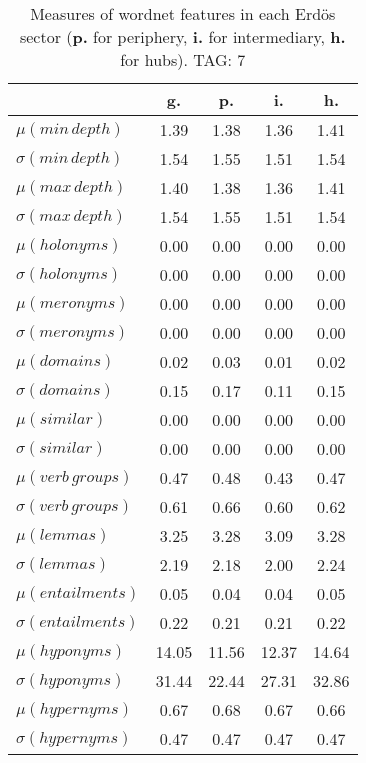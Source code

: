 \begin{table}[h!]
\begin{center}
\begin{tabular}{| l | c | c | c | c |}\hline
 & g. & p. & i. & h. \\\hline
$\mu(min\,depth)$ & 1.39  & 1.38  & 1.36  & 1.41 \\\hline
$\sigma(min\,depth)$ & 1.54  & 1.55  & 1.51  & 1.54 \\\hline
$\mu(max\,depth)$ & 1.40  & 1.38  & 1.36  & 1.41 \\\hline
$\sigma(max\,depth)$ & 1.54  & 1.55  & 1.51  & 1.54 \\\hline
$\mu(holonyms)$ & 0.00  & 0.00  & 0.00  & 0.00 \\\hline
$\sigma(holonyms)$ & 0.00  & 0.00  & 0.00  & 0.00 \\\hline
$\mu(meronyms)$ & 0.00  & 0.00  & 0.00  & 0.00 \\\hline
$\sigma(meronyms)$ & 0.00  & 0.00  & 0.00  & 0.00 \\\hline
$\mu(domains)$ & 0.02  & 0.03  & 0.01  & 0.02 \\\hline
$\sigma(domains)$ & 0.15  & 0.17  & 0.11  & 0.15 \\\hline
$\mu(similar)$ & 0.00  & 0.00  & 0.00  & 0.00 \\\hline
$\sigma(similar)$ & 0.00  & 0.00  & 0.00  & 0.00 \\\hline
$\mu(verb\,groups)$ & 0.47  & 0.48  & 0.43  & 0.47 \\\hline
$\sigma(verb\,groups)$ & 0.61  & 0.66  & 0.60  & 0.62 \\\hline
$\mu(lemmas)$ & 3.25  & 3.28  & 3.09  & 3.28 \\\hline
$\sigma(lemmas)$ & 2.19  & 2.18  & 2.00  & 2.24 \\\hline
$\mu(entailments)$ & 0.05  & 0.04  & 0.04  & 0.05 \\\hline
$\sigma(entailments)$ & 0.22  & 0.21  & 0.21  & 0.22 \\\hline
$\mu(hyponyms)$ & 14.05  & 11.56  & 12.37  & 14.64 \\\hline
$\sigma(hyponyms)$ & 31.44  & 22.44  & 27.31  & 32.86 \\\hline
$\mu(hypernyms)$ & 0.67  & 0.68  & 0.67  & 0.66 \\\hline
$\sigma(hypernyms)$ & 0.47  & 0.47  & 0.47  & 0.47 \\\hline
\end{tabular}
\caption{Measures of wordnet features in each Erd\"os sector ({{\bf p.}} for periphery, {{\bf i.}} for intermediary, {{\bf h.}} for hubs). TAG: 7}
\end{center}
\end{table}